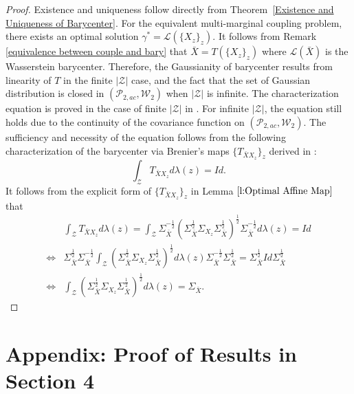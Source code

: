\documentclass[twoside,11pt]{article}
\begin{document}
\begin{proof}
Existence and uniqueness follow directly from Theorem~\ref{Existence and Uniqueness of Barycenter}. For the equivalent multi-marginal coupling problem, there exists an optimal solution $\gamma^* = \mathcal{L}(\{X_z\}_z)$. It follows from Remark \ref{equivalence between couple and bary} that $\bar{X} = T(\{X_z\}_z)$ where $\mathcal{L}(\bar{X})$ is the Wasserstein barycenter. Therefore, the Gaussianity of barycenter results from linearity of $T$ in the finite $|\mathcal{Z}|$ case, and the fact that the set of Gaussian distribution is closed in $(\mathcal{P}_{2,ac}, \mathcal{W}_2)$ when $|\mathcal{Z}|$ is infinite. The characterization equation is proved in the case of finite $|\mathcal{Z}|$ in \cite{agueh2011barycenters}. For infinite $|\mathcal{Z}|$, the equation still holds due to the continuity of the covariance function on $(\mathcal{P}_{2,ac}, \mathcal{W}_2)$. The sufficiency and necessity of the equation follows from the following characterization of the barycenter via Brenier's maps $\{T_{\bar{X}X_z}\}_z$ derived in \cite{agueh2011barycenters}:
\begin{equation}
\int_{\mathcal{Z}} T_{\bar{X}X_z} d\lambda(z) = Id.
\end{equation}
It follows from the explicit form of $\{T_{\bar{X}X_z}\}_z$ in Lemma $\ref{l:Optimal Affine Map}$ that 
\begin{align*}
& \int_{\mathcal{Z}} T_{\bar{X}X_z} d\lambda(z) = \int_{\mathcal{Z}} \Sigma_{\bar{X}}^{-\frac{1}{2}} (\Sigma_{\bar{X}}^{\frac{1}{2}} \Sigma_{X_z} \Sigma_{\bar{X}}^{\frac{1}{2}} )^{\frac{1}{2}} \Sigma_{\bar{X}}^{-\frac{1}{2}} d\lambda(z) = Id\\
\iff &  \Sigma_{\bar{X}}^{\frac{1}{2}} \Sigma_{\bar{X}}^{-\frac{1}{2}} \int_{\mathcal{Z}} (\Sigma_{\bar{X}}^{\frac{1}{2}} \Sigma_{X_z} \Sigma_{\bar{X}}^{\frac{1}{2}} )^{\frac{1}{2}} d\lambda(z) \Sigma_{\bar{X}}^{-\frac{1}{2}} \Sigma_{\bar{X}}^{\frac{1}{2}} = \Sigma_{\bar{X}}^{\frac{1}{2}} Id \Sigma_{\bar{X}}^{\frac{1}{2}}\\
\iff & \int_{\mathcal{Z}} (\Sigma_{\bar{X}}^{\frac{1}{2}} \Sigma_{X_z} \Sigma_{\bar{X}}^{\frac{1}{2}} )^{\frac{1}{2}} d\lambda(z) = \Sigma_{\bar{X}}.
\end{align*}
\end{proof}


\section{Appendix: Proof of Results in Section 4} \label{A:Section 4 Appendix}
\end{document}
